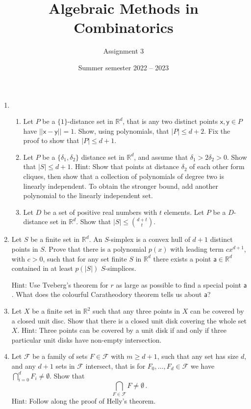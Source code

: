 \documentclass[kulak]{tplt}
\title{Algebraic Methods in Combinatorics}
\author{Assignment 3}
\date{Summer semester 2022 -- 2023}
\theoremstyle{definition}
\newcommand{\R}{\mathbb{R}}
\newcommand{\FF}{\mathcal F}
\newcommand{\vx}{\mathsf{x}}
\newcommand{\vy}{\mathsf{y}}
\newcommand{\va}{\mathsf{a}}
\begin{document}
\maketitle
\begin{enumerate}
\item 

\begin{enumerate}
\item  Let $P$ be a $\{1\}$-distance set in $\R^d$, that is any two distinct points $\vx, \vy \in P $ have $||\vx - \vy || = 1$.
Show, using polynomials, that $|P| \leq d+2$.
Fix the proof to show that $|P| \leq d+1$.

\item Let $P$ be a $\{\delta_1, \delta_2\}$ distance set in $\R^d $, and assume that $\delta_1> 2 \delta_2 > 0$.
Show that $|S| \leq d+1$.
Hint: Show that points at distance $\delta_2$ of each other form cliques, then show that a collection of polynomials of degree two is linearly independent.
To obtain the stronger bound, add another polynomial to the linearly independent set.

\item
Let $D $ be a set of positive real numbers with $t$ elements.
Let $P$ be a $D$-distance set in $\R^d$.
Show that $|S| \leq \binom{d+t}{t}$.

\end{enumerate}

\item Let $S$ be a finite set in $\R^d$.
An $S$-simplex is a convex hull of $d+1$ distinct points in $S$.
Prove that there is a polynomial $p(x)$ with leading term $c x^{d+1}$, with $c > 0$, such that for any set finite $S$ in $\R^d$ there exists a point $\va \in \R^d$ contained in at least $p(|S|)$ $S$-simplices.

Hint: Use Tveberg's theorem for $r$ as large as possible to find a special point $\va$.
What does the colourful Caratheodory theorem tells us about $\va$?


\item Let $X$ be a finite set in $\R^2$ such that any three points in $X$ can be covered by a closed unit disc.
Show that there is a closed unit disk covering the whole set $X$.
Hint: Three points can be covered by a unit disk if and only if three particular unit disks have non-empty intersection.


\item Let $\mathcal F $ be a family of sets $F\in \FF $ with $m \geq d+1$, such that any set has size $d$, and any $d+1$ sets in $\FF $ intersect, that is for $F_0, \ldots, F_d \in \FF $ we have $\bigcap_{i=0}^d F_i \neq \emptyset$.
Show that 
$$ \bigcap_{F \in \FF} F \neq \emptyset \, . $$
Hint: 
Follow along the proof of Helly's theorem.


\end{enumerate}
\end{document}
